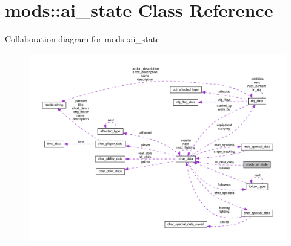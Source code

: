 \hypertarget{classmods_1_1ai__state}{}\section{mods\+:\+:ai\+\_\+state Class Reference}
\label{classmods_1_1ai__state}


Collaboration diagram for mods\+:\+:ai\+\_\+state\+:
\nopagebreak
\begin{figure}[H]
\begin{center}
\leavevmode
\includegraphics[width=350pt]{classmods_1_1ai__state__coll__graph}
\end{center}
\end{figure}
